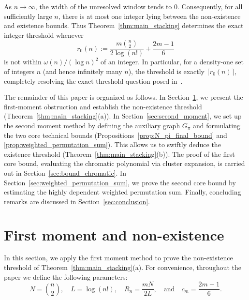 \documentclass[10pt,a4paper]{amsart}
\renewcommand\to{\rightarrow}
\begin{document}
As $n\to\infty$, the width of the unresolved window tends to $0$. Consequently, for all sufficiently large $n$, there is at most one integer lying between the non-existence and existence bounds. Thus Theorem~\ref{thm:main_stacking} determines the exact integer threshold whenever
\[
r_0(n):=\frac{m\binom{n}{2}}{2\log(n!)}+\frac{2m-1}{6}
\]
is not within $\omega(n)/(\log n)^2$ of an integer. In particular, for a density-one set of integers $n$ (and hence infinitely many $n$), the threshold is exactly $\lceil r_0(n)\rceil$, completely resolving the exact threshold question posed in~\cite{ADK}.

The remainder of this paper is organized as follows. In Section~\ref{sec:first_moment}, we present the first-moment obstruction and establish the non-existence threshold (Theorem~\ref{thm:main_stacking}(a)). In Section~\ref{sec:second_moment}, we set up the second moment method by defining the auxiliary graph $G_\pi$ and formulating the two core technical bounds (Propositions~\ref{prop:N_pi_final_bound} and \ref{prop:weighted_permutation_sum}). This allows us to swiftly deduce the existence threshold (Theorem~\ref{thm:main_stacking}(b)). The proof of the first core bound, evaluating the chromatic polynomial via cluster expansion, is carried out in Section~\ref{sec:bound_chromatic}. In Section~\ref{sec:weighted_permutation_sum}, we prove the second core bound by estimating the highly dependent weighted permutation sum. Finally, concluding remarks are discussed in Section~\ref{sec:conclusion}.



\section{First moment and non-existence}\label{sec:first_moment}

In this section, we apply the first moment method to prove the non-existence threshold of Theorem~\ref{thm:main_stacking}(a). For convenience, throughout the paper we define the following parameters:
\[ N = \binom{n}{2}, \quad L = \log(n!), \quad R_{n} = \frac{mN}{2L}, \quad \text{and} \quad c_{m} = \frac{2m-1}{6}. \]
\end{document}

